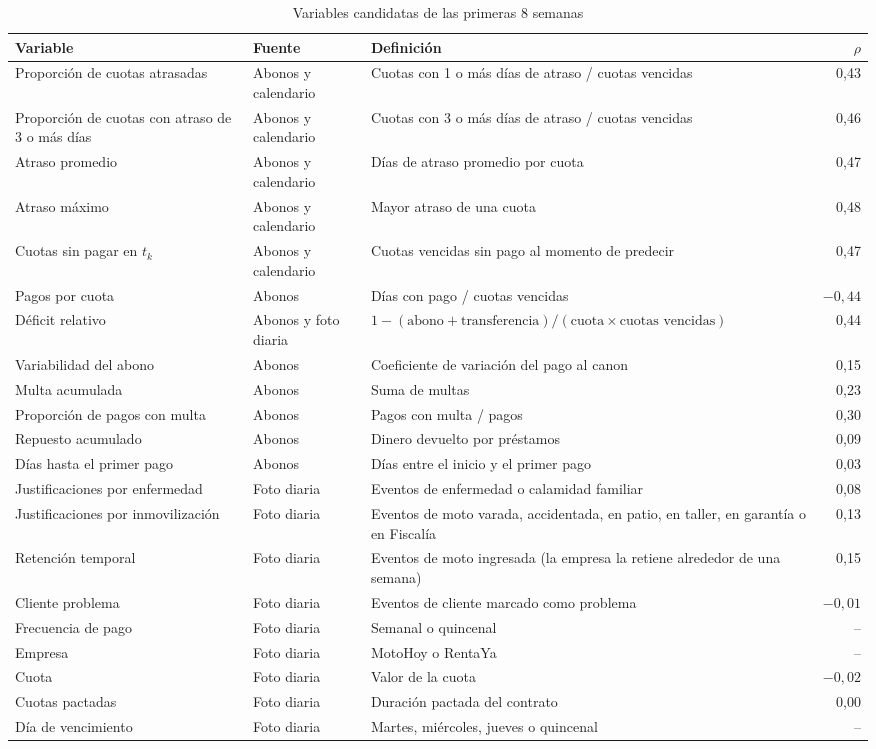 \documentclass[journal]{IEEEtran}
\begin{document}
\begin{table}[!t]
\caption{Variables candidatas de las primeras 8 semanas}
\label{tab:variables}
\centering
\small
\begin{tabularx}{\textwidth}{@{}llLr@{}}
\toprule
Variable & Fuente & Definición & $\rho$ \\
\midrule
Proporción de cuotas atrasadas & Abonos y calendario & Cuotas con 1 o más días de atraso / cuotas vencidas & 0,43 \\
Proporción de cuotas con atraso de 3 o más días & Abonos y calendario & Cuotas con 3 o más días de atraso / cuotas vencidas & 0,46 \\
Atraso promedio & Abonos y calendario & Días de atraso promedio por cuota & 0,47 \\
Atraso máximo & Abonos y calendario & Mayor atraso de una cuota & 0,48 \\
Cuotas sin pagar en $t_k$ & Abonos y calendario & Cuotas vencidas sin pago al momento de predecir & 0,47 \\
Pagos por cuota & Abonos & Días con pago / cuotas vencidas & $-0{,}44$ \\
Déficit relativo & Abonos y foto diaria & $1 - (\text{abono} + \text{transferencia}) / (\text{cuota} \times \text{cuotas vencidas})$ & 0,44 \\
Variabilidad del abono & Abonos & Coeficiente de variación del pago al canon & 0,15 \\
Multa acumulada & Abonos & Suma de multas & 0,23 \\
Proporción de pagos con multa & Abonos & Pagos con multa / pagos & 0,30 \\
Repuesto acumulado & Abonos & Dinero devuelto por préstamos & 0,09 \\
Días hasta el primer pago & Abonos & Días entre el inicio y el primer pago & 0,03 \\
Justificaciones por enfermedad & Foto diaria & Eventos de enfermedad o calamidad familiar & 0,08 \\
Justificaciones por inmovilización & Foto diaria & Eventos de moto varada, accidentada, en patio, en taller, en garantía o en Fiscalía & 0,13 \\
Retención temporal & Foto diaria & Eventos de moto ingresada (la empresa la retiene alrededor de una semana) & 0,15 \\
Cliente problema & Foto diaria & Eventos de cliente marcado como problema & $-0{,}01$ \\
Frecuencia de pago & Foto diaria & Semanal o quincenal & -- \\
Empresa & Foto diaria & MotoHoy o RentaYa & -- \\
Cuota & Foto diaria & Valor de la cuota & $-0{,}02$ \\
Cuotas pactadas & Foto diaria & Duración pactada del contrato & 0,00 \\
Día de vencimiento & Foto diaria & Martes, miércoles, jueves o quincenal & -- \\
\bottomrule
\end{tabularx}
\end{table}
\end{document}

